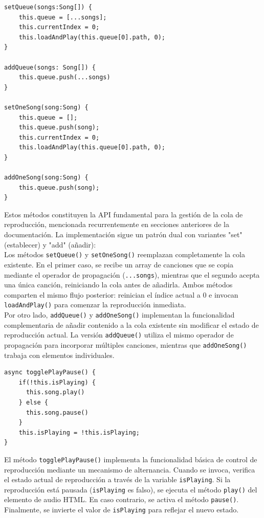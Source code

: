 \documentclass[11pt, a4paper]{article}
\begin{document}
                \begin{lstlisting}[caption={set y add}]
setQueue(songs:Song[]) {
    this.queue = [...songs];
    this.currentIndex = 0;
    this.loadAndPlay(this.queue[0].path, 0);
}

addQueue(songs: Song[]) {
    this.queue.push(...songs)
}

setOneSong(song:Song) {
    this.queue = [];
    this.queue.push(song);
    this.currentIndex = 0;
    this.loadAndPlay(this.queue[0].path, 0);
}

addOneSong(song:Song) {
    this.queue.push(song);
}
                \end{lstlisting}

                Estos métodos constituyen la API fundamental para la gestión de la cola de reproducción, mencionada recurrentemente en secciones anteriores de la documentación. La implementación sigue un patrón dual con variantes "set" (establecer) y "add" (añadir): \\

                Los métodos \verb|setQueue()| y \verb|setOneSong()| reemplazan completamente la cola existente. En el primer caso, se recibe un array de canciones que se copia mediante el operador de propagación (\verb|...songs|), mientras que el segundo acepta una única canción, reiniciando la cola antes de añadirla. Ambos métodos comparten el mismo flujo posterior: reinician el índice actual a 0 e invocan \verb|loadAndPlay()| para comenzar la reproducción inmediata. \\

                Por otro lado, \verb|addQueue()| y \verb|addOneSong()| implementan la funcionalidad complementaria de añadir contenido a la cola existente sin modificar el estado de reproducción actual. La versión \verb|addQueue()| utiliza el mismo operador de propagación para incorporar múltiples canciones, mientras que \verb|addOneSong()| trabaja con elementos individuales. \\

                \begin{lstlisting}[caption={togglePlayPause()}]
async togglePlayPause() {
    if(!this.isPlaying) {
      this.song.play()
    } else {
      this.song.pause()
    }
    this.isPlaying = !this.isPlaying;
}
                \end{lstlisting}
                 
                El método \verb|togglePlayPause()| implementa la funcionalidad básica de control de reproducción mediante un mecanismo de alternancia. Cuando se invoca, verifica el estado actual de reproducción a través de la variable \verb|isPlaying|. Si la reproducción está pausada (\verb|isPlaying| es falso), se ejecuta el método \verb|play()| del elemento de audio HTML. En caso contrario, se activa el método \verb|pause()|. Finalmente, se invierte el valor de \verb|isPlaying| para reflejar el nuevo estado.
\end{document}
